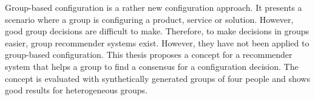 \Abstract

Group-based configuration is a rather new configuration approach. It presents a scenario where a group is configuring a product, service or solution. However, good group decisions are difficult to make. Therefore, to make decisions in groups easier, group recommender systems exist. However, they have not been applied to group-based configuration. This thesis proposes a concept for a recommender system that helps a group to find a consensus for a configuration decision. The concept is evaluated with synthetically generated groups of four people and shows good results for heterogeneous groups.